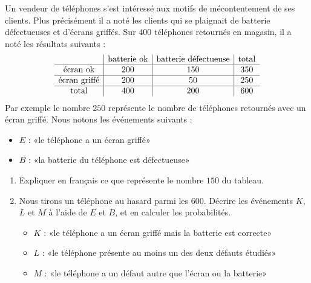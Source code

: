 
\begin{exercice}\label{exosmath-0710}

    Un vendeur de téléphones s'est intéressé aux motifs de mécontentement de ses clients. Plus précisément il a noté les clients qui se plaignait de batterie défectueuses et d'écrans griffés. Sur \( 400\) téléphones retournés en magasin, il a noté les résultats suivants :
    \begin{equation*}
        \begin{array}[]{c|c|c|c}
            &\text{batterie ok}&\text{batterie défectueuse}&\text{total}\\
            \hline
            \text{écran ok}&200&150&350\\
            \hline
            \text{écran griffé}&200&50&250\\
            \hline
            \text{total}&400&200&600\\
        \end{array}
    \end{equation*}
    Par exemple le nombre \( 250\) représente le nombre de téléphones retournés avec un écran griffé. Nous notons les événements suivants :
    \begin{itemize}
        \item $E$ : «le téléphone a un écran griffé» 
        \item $B$ : «la batterie du téléphone est défectueuse» 
    \end{itemize}
    \begin{enumerate}
        \item
            Expliquer en français ce que représente le nombre \( 150\) du tableau.
        \item
            Nous tirons un téléphone au hasard parmi les \( 600\). Décrire les événements \( K\), \( L\) et \( M\) à l'aide de \( E\) et \( B\), et en calculer les probabilités.
            \begin{itemize}
                \item \( K\) : «le téléphone a un écran griffé mais la batterie est correcte» 
                \item \( L\) : «le téléphone présente au moins un des deux défauts étudiés» 
                \item \( M\) : «le téléphone a un défaut autre que l'écran ou la batterie» 
            \end{itemize}
    \end{enumerate}

\end{exercice}
